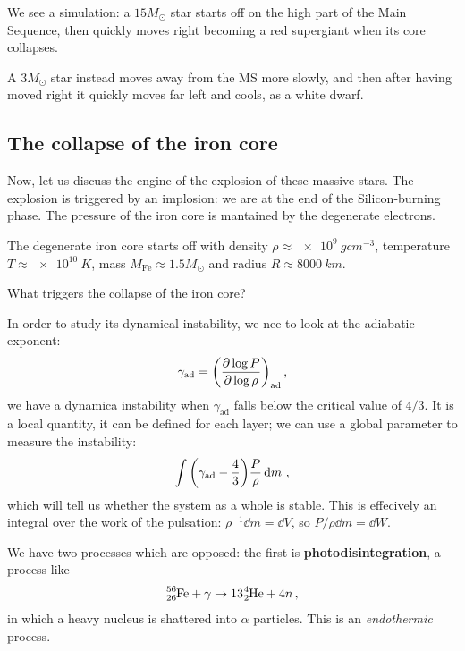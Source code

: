 \documentclass[main.tex]{subfiles}
\begin{document}
We see a simulation: a \(15 M_{\odot}  \) star starts off on the high part of the Main Sequence, then quickly moves right becoming a red supergiant when its core collapses.

A \(3 M_{\odot}\) star instead moves away from the MS more slowly, and then after having moved right it quickly moves far left and cools, as a white dwarf. 

\subsection{The collapse of the iron core}

Now, let us discuss the engine of the explosion of these massive stars. The explosion is triggered by an implosion: we are at the end of the Silicon-burning phase. 
The pressure of the iron core is mantained by the degenerate electrons. 

The degenerate iron core starts off with density \(\rho \approx
\SI{e9}{g cm^{-3}}\), temperature \(T \approx \SI{e10}{K}\), mass \(M _{\text{Fe}} \approx \num{1.5} M_{\odot}\) and radius \(R \approx \SI{8000}{km}\). 

What triggers the collapse of the iron core? 

In order to study its dynamical instability, we nee to look at the adiabatic exponent:
%
\begin{align}
  \gamma _{\text{ad}} = \qty(\pdv{\log P}{\log \rho })_{\text{ad}}
\,,
\end{align}
%
we have a dynamica instability when  \(\gamma _{\text{ad}}\) falls below the critical value of \(4/3\). 
It is a local quantity, it can be defined for each layer; we can use a global parameter to measure the instability: 
%
\begin{align}
  \int \qty(\gamma _{\text{ad}} - \frac{4}{3}) \frac{P}{\rho } \dd{m}
\,,
\end{align}
%
which will tell us whether the system as a whole is stable. 
This is effecively an integral over the work of the pulsation: \(\rho^{-1} \dd{m} = \dd{V}\), so \(P/\rho \dd{m} = \dd{W}\).

We have two processes which are opposed: the first is \textbf{photodisintegration}, a process like 
%
\begin{align}
\ce{^{56}_{26}Fe} + \gamma \rightarrow 
13 \ce{^{4}_{2}He} + 4n
\,,
\end{align}
%
in which a heavy nucleus is shattered into \(\alpha \) particles. This is an \emph{endothermic} process.
\end{document}
